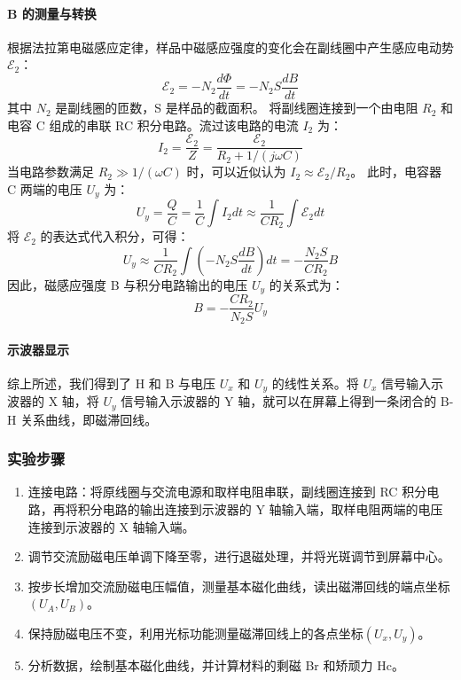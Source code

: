 \documentclass[]{../../templates/Report}%
\begin{document}
\paragraph{B 的测量与转换}
根据法拉第电磁感应定律，样品中磁感应强度的变化会在副线圈中产生感应电动势 $\mathcal{E}_2$：
\begin{equation}
    \mathcal{E}_2 = -N_2 \frac{d\Phi}{dt} = -N_2 S \frac{dB}{dt}
\end{equation}
其中 $N_2$ 是副线圈的匝数，S 是样品的截面积。
将副线圈连接到一个由电阻 $R_2$ 和电容 C 组成的串联 RC 积分电路。流过该电路的电流 $I_2$ 为：
\begin{equation}
    I_2 = \frac{\mathcal{E}_2}{Z} = \frac{\mathcal{E}_2}{R_2 + 1/(j\omega C)}
\end{equation}
当电路参数满足 $R_2 \gg 1/(\omega C)$ 时，可以近似认为 $I_2 \approx \mathcal{E}_2 / R_2$。
此时，电容器 C 两端的电压 $U_y$ 为：
\begin{equation}
    U_y = \frac{Q}{C} = \frac{1}{C} \int I_2 dt \approx \frac{1}{CR_2} \int \mathcal{E}_2 dt
\end{equation}
将 $\mathcal{E}_2$ 的表达式代入积分，可得：
\begin{equation}
    U_y \approx \frac{1}{CR_2} \int \left(-N_2 S \frac{dB}{dt}\right) dt = -\frac{N_2 S}{C R_2} B
\end{equation}
因此，磁感应强度 B 与积分电路输出的电压 $U_y$ 的关系式为：
\begin{equation}
    \boxed{B = -\frac{C R_2}{N_2 S} U_y}
\end{equation}

\paragraph{示波器显示}
综上所述，我们得到了 H 和 B 与电压 $U_x$ 和 $U_y$ 的线性关系。将 $U_x$ 信号输入示波器的 X 轴，将 $U_y$ 信号输入示波器的 Y 轴，就可以在屏幕上得到一条闭合的 B-H 关系曲线，即磁滞回线。

\subsubsection{实验步骤}
\begin{enumerate}
    \item 连接电路：将原线圈与交流电源和取样电阻串联，副线圈连接到 RC 积分电路，再将积分电路的输出连接到示波器的 Y 轴输入端，取样电阻两端的电压连接到示波器的 X 轴输入端。
    \item 调节交流励磁电压单调下降至零，进行退磁处理，并将光斑调节到屏幕中心。
    \item 按步长增加交流励磁电压幅值，测量基本磁化曲线，读出磁滞回线的端点坐标$(U_A, U_B)$。
    \item 保持励磁电压不变，利用光标功能测量磁滞回线上的各点坐标$(U_x, U_y)$。
    \item 分析数据，绘制基本磁化曲线，并计算材料的剩磁 Br 和矫顽力 Hc。
\end{enumerate}
\end{document}
